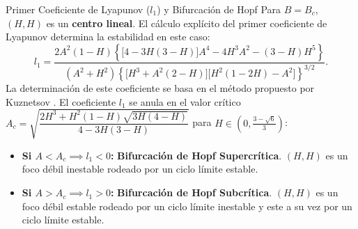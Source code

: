 \documentclass[10pt, aspectratio=169]{beamer}
\begin{document}
	\begin{frame}{Primer Coeficiente de Lyapunov ($l_1$) y Bifurcación de Hopf}
		Para $B = B_c$, $(H,H)$ es un \textbf{centro lineal}. El cálculo explícito del primer coeficiente de Lyapunov determina la estabilidad en este caso:
		\begin{equation*}
			l_1 = \dfrac{2A^2(1-H) \left\{ \big[4 - 3H(3-H)\big] A^4 - 4H^3 A^2 - (3-H)H^5 \right\}}{(A^2+H^2) \left\{ \big[H^3 + A^2(2-H)\big]\big[H^2(1-2H)-A^2\big] \right\}^{3/2}}.
		\end{equation*}
		La determinación de este coeficiente se basa en el método propuesto por Kuznetsov \cite{kuznetsov}. El coeficiente $l_1$ se anula en el valor crítico $A_c = \sqrt{\dfrac{2H^3 + H^2(1-H)\sqrt{3H(4-H)}}{4 - 3H(3-H)}}$ para $H \in \left(0, \frac{3-\sqrt{6}}{3}\right)$:
		
		\begin{itemize}
			\item \textbf{Si $A < A_c \implies l_1 < 0$:} \textbf{Bifurcación de Hopf Supercrítica}. $(H,H)$ es un foco débil inestable rodeado por un ciclo límite estable.
			\item \textbf{Si $A > A_c \implies l_1 > 0$:} \textbf{Bifurcación de Hopf Subcrítica}. $(H,H)$ es un foco débil estable rodeado por un ciclo límite inestable y este a su vez por un ciclo límite estable.
		\end{itemize}
	\end{frame}
	
\end{document}
